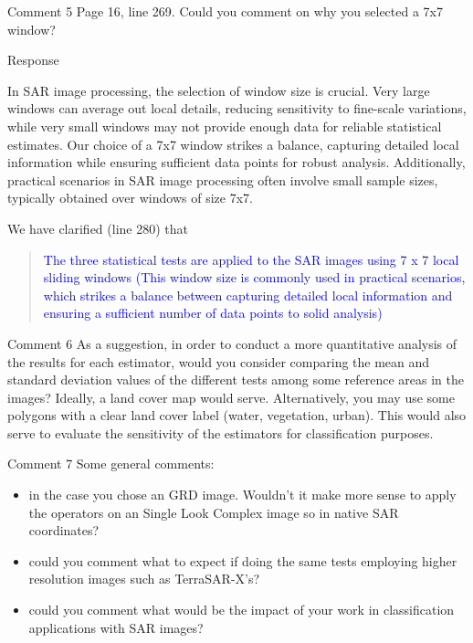 \documentclass[11pt]{report}
\begin{document}
\begin{reviewbox}{Comment 5}
Page 16, line 269. Could you comment on why you selected a 7x7 window?
\end{reviewbox}
\begin{responsebox}{Response}

In SAR image processing, the selection of window size is crucial. Very large windows can average out local details, reducing sensitivity to fine-scale variations, while very small windows may not provide enough data for reliable statistical estimates. Our choice of a 7x7 window strikes a balance, capturing detailed local information while ensuring sufficient data points for robust analysis. Additionally, practical scenarios in SAR image processing often involve small sample sizes, typically obtained over windows of size 7x7. 

We have clarified (line 280) that

\begin{quote}
	\textcolor{blue}{The three statistical tests are applied to the SAR images using 7 x 7 local sliding 
windows (This window size is commonly used in practical scenarios, which strikes a balance between capturing detailed local information and ensuring a sufficient number of data points to solid analysis)}
\end{quote}



\end{responsebox}


\begin{reviewbox}{Comment 6}
As a suggestion, in order to conduct a more quantitative analysis of the results for each estimator, would you consider comparing the mean and standard deviation values of the different tests among some reference areas in the images? Ideally, a land cover map would serve. Alternatively, you may use some polygons with a clear land cover label (water, vegetation, urban). This would also serve to evaluate the sensitivity of the estimators for classification purposes.
\end{reviewbox}

\begin{reviewbox}{Comment 7}
Some general comments:
\begin{itemize}
	\item in the case you chose an GRD image. Wouldn't it make more sense to apply the operators on an Single Look Complex image so in native SAR coordinates?
	\item could you comment what to expect if doing the same tests employing higher resolution images such as TerraSAR-X's?
	\item could you comment what would be the impact of your work in classification applications with SAR images?
\end{itemize}
\end{reviewbox}
\end{document}
